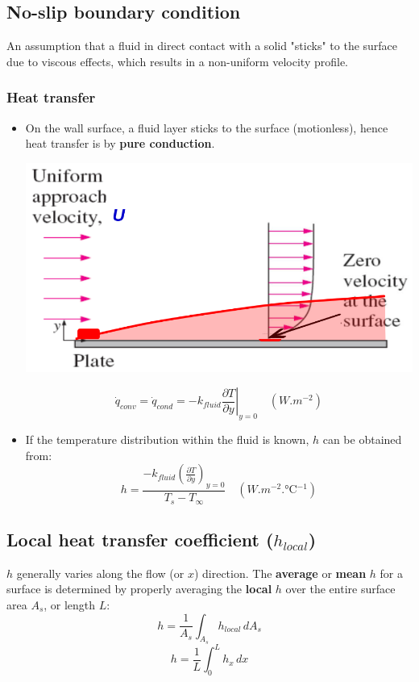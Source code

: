 \documentclass[11pt]{article}
\begin{document}
 \newpage
\subsection{No-slip boundary condition}
\label{sec:org8d0e998}
An assumption that a fluid in direct contact with a solid "sticks" to the surface due to viscous effects, which results in a non-uniform velocity profile.
\subsubsection{Heat transfer}
\label{sec:orgebc669a}
\begin{itemize}
\item On the wall surface, a fluid layer sticks to the surface (motionless), hence heat transfer is by \textbf{pure conduction}.
\begin{center}
\includegraphics[width=.9\linewidth]{./images/no-slip-boundary-condition-diagram.png}
\end{center}

\[\dot{q}_{conv} = \dot{q}_{cond} = - k_{fluid} \left. \frac{\partial T}{\partial y} \right|_{y = 0} \quad (\unit{W.m^{-2}})\]

\item If the temperature distribution within the fluid is known, \(h\) can be obtained from:
\[h = \frac{-k_{fluid} \left(\frac{\partial T}{\partial y} \right)_{y=0}}{T_s - T_{\infty}} \quad (\unit{W.m^{-2}.\degreeCelsius^{-1}})\]
\end{itemize}

 \newpage
\subsection{Local heat transfer coefficient (\(h_{local}\))}
\label{sec:orga3f1809}
\(h\) generally varies along the flow (or \(x\)) direction. The \textbf{average} or \textbf{mean} \(h\) for a surface is determined by properly averaging the \textbf{local} \(h\) over the entire surface area \(A_s\), or length \(L\):
\[h = \frac{1}{A_s} \int_{A_s} h_{local} \, dA_s\]
\[h = \frac{1}{L} \int_0^L h_x \, dx\]
\end{document}
